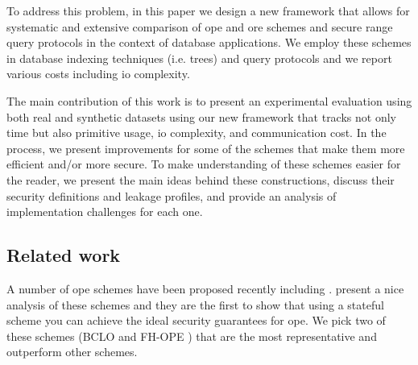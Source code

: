 	To address this problem, in this paper we design a new framework that allows for systematic and extensive comparison of \acrshort{ope} and \acrshort{ore} schemes and secure range query protocols in the context of database applications.
	We employ these schemes in database indexing techniques (i.e. {\BPlus} trees) and query protocols and we report various costs including \acrshort{io} complexity.

	The main contribution of this work is to present an experimental evaluation using both real and synthetic datasets using our new framework that tracks not only time but also primitive usage, \acrshort{io} complexity, and communication cost.
	In the process, we present improvements for some of the schemes that make them more efficient and/or more secure.
	To make understanding of these schemes easier for the reader, we present the main ideas behind these constructions, discuss their security definitions and leakage profiles, and provide an analysis of implementation challenges for each one.

	\subsection{Related work}

		A number of \acrshort{ope} schemes have been proposed recently including \cite{ope-original, anti-tamper-dbs, bclo-ope, ope-leakage, ope-beyond-one-wayness, ope-early-fh-ope, ope-beyond-ideal-object, ope-mv-opes, fh-ope, ope-mv-popes, ope-multi-user, ope-note, ope-for-encrypted-dbs, ope-structure, ope-non-linear}. %
		\textcite{ope-ideal-security-protocol} present a nice analysis of these schemes and they are the first to show that using a stateful scheme you can achieve the ideal security guarantees for \acrshort{ope}.
		We pick two of these schemes (BCLO \cite{bclo-ope} and FH-OPE \cite{fh-ope}) that are the most representative and outperform other schemes.

